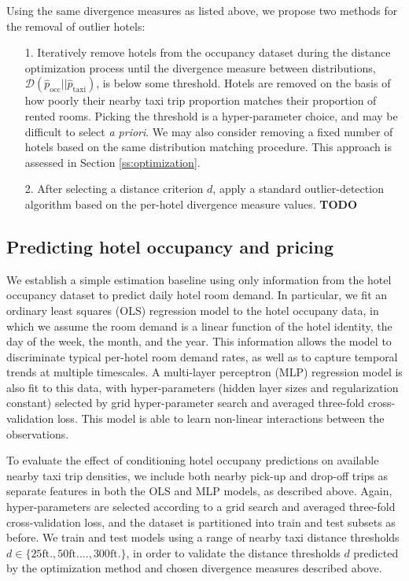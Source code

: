 \documentclass[useAMS, usenatbib]{biom}
\begin{document}
Using the same divergence measures as listed above, we propose two methods for the removal of outlier hotels:

\begin{itemize}

\item [1.] Iteratively remove hotels from the occupancy dataset during the distance optimization process until the divergence measure between distributions, $\mathcal{D} (\hat{p}_{\mathrm{occ}} || \hat{p}_{\mathrm{taxi}})$, is below some threshold. Hotels are removed on the basis of how poorly their nearby taxi trip proportion matches their proportion of rented rooms. Picking the threshold is a hyper-parameter choice, and may be difficult to select \textit{a priori}. We may also consider removing a fixed number of hotels based on the same distribution matching procedure. This approach is assessed in Section \ref{ss:optimization}.

\item [2.] After selecting a distance criterion $d$, apply a standard outlier-detection algorithm based on the per-hotel divergence measure values. \textbf{TODO}

\end{itemize}

\subsection{Predicting hotel occupancy and pricing}

We establish a simple estimation baseline using only information from the hotel occupancy dataset to predict daily hotel room demand. In particular, we fit an ordinary least squares (OLS) regression model to the hotel occupany data, in which we assume the room demand is a linear function of the hotel identity, the day of the week, the month, and the year. This information allows the model to discriminate typical per-hotel room demand rates, as well as to capture temporal trends at multiple timescales. A multi-layer perceptron (MLP) regression model is also fit to this data, with hyper-parameters (hidden layer sizes and regularization constant) selected by grid hyper-parameter search and averaged three-fold cross-validation loss. This model is able to learn non-linear interactions between the observations.

To evaluate the effect of conditioning hotel occupany predictions on available nearby taxi trip densities, we include both nearby pick-up and drop-off trips as separate features in both the OLS and MLP models, as described above. Again, hyper-parameters are selected according to a grid search and averaged three-fold cross-validation loss, and the dataset is partitioned into train and test subsets as before. We train and test models using a range of nearby taxi distance thresholds $d \in \{25 \mathrm{ft.}, 50 \mathrm{ft.} ..., 300 \mathrm{ft.} \}$, in order to validate the distance thresholds $d$ predicted by the optimization method and chosen divergence measures described above.
\end{document}
